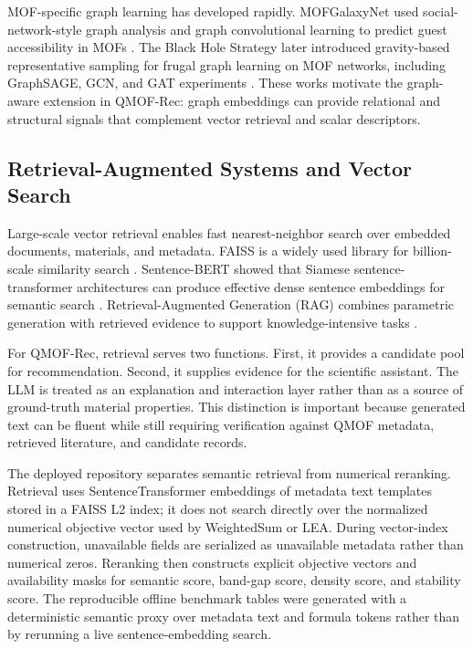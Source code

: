 \documentclass[12pt,a4paper]{article}
\begin{document}
MOF-specific graph learning has developed rapidly. MOFGalaxyNet used social-network-style graph analysis and graph convolutional learning to predict guest accessibility in MOFs \cite{jalali2023}. The Black Hole Strategy later introduced gravity-based representative sampling for frugal graph learning on MOF networks, including GraphSAGE, GCN, and GAT experiments \cite{jalali2025bh}. These works motivate the graph-aware extension in QMOF-Rec: graph embeddings can provide relational and structural signals that complement vector retrieval and scalar descriptors.

\subsection{Retrieval-Augmented Systems and Vector Search}

Large-scale vector retrieval enables fast nearest-neighbor search over embedded documents, materials, and metadata. FAISS is a widely used library for billion-scale similarity search \cite{johnson2019}. Sentence-BERT showed that Siamese sentence-transformer architectures can produce effective dense sentence embeddings for semantic search \cite{reimers2019}. Retrieval-Augmented Generation (RAG) combines parametric generation with retrieved evidence to support knowledge-intensive tasks \cite{lewis2020}.

For QMOF-Rec, retrieval serves two functions. First, it provides a candidate pool for recommendation. Second, it supplies evidence for the scientific assistant. The LLM is treated as an explanation and interaction layer rather than as a source of ground-truth material properties. This distinction is important because generated text can be fluent while still requiring verification against QMOF metadata, retrieved literature, and candidate records.

The deployed repository separates semantic retrieval from numerical reranking. Retrieval uses SentenceTransformer embeddings of metadata text templates stored in a FAISS L2 index; it does not search directly over the normalized numerical objective vector used by WeightedSum or LEA. During vector-index construction, unavailable fields are serialized as unavailable metadata rather than numerical zeros. Reranking then constructs explicit objective vectors and availability masks for semantic score, band-gap score, density score, and stability score. The reproducible offline benchmark tables were generated with a deterministic semantic proxy over metadata text and formula tokens rather than by rerunning a live sentence-embedding search.
\end{document}
